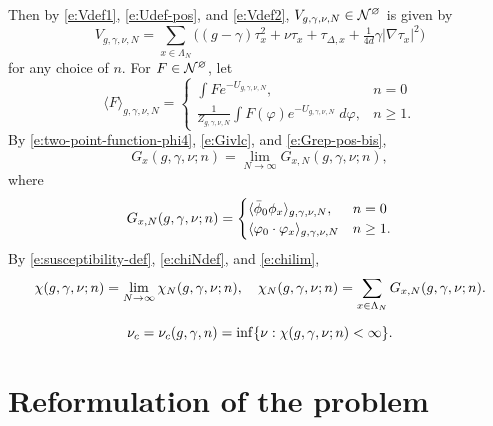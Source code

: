 Then by \eqref{e:Vdef1}, \eqref{e:Udef-pos}, and \eqref{e:Vdef2},
$V_{g,\gamma,\nu,N} \in \mathcal{N}^\varnothing$ is given by
\begin{equation}
V_{g,\gamma,\nu,N}
	=
\sum_{x\in\Lambda_N}
\Big(
	(g - \gamma) \tau_x^2 + \nu \tau_x + \tau_{\Delta,x} + \tfrac{1}{4 d} \gamma |\nabla\tau_x|^2
\Big)
\end{equation}
for any choice of $n$.
For $F \in \mathcal{N}^\varnothing$, let
\begin{equation}
\langle F \rangle_{g,\gamma,\nu,N}
	=
\begin{cases}
\displaystyle \int F e^{-U_{g,\gamma,\nu,N}},           & n = 0 \\
\displaystyle \frac{1}{Z_{g,\gamma,\nu,N}}
	\int F(\varphi) e^{-U_{g,\gamma,\nu,N}} \; d\varphi,  & n \ge 1.
\end{cases}
\end{equation}
By \eqref{e:two-point-function-phi4}, \eqref{e:Givlc}, and \eqref{e:Grep-pos-bis},
\begin{equation}
G_x(g, \gamma, \nu; n) = \lim_{N\to\infty} G_{x,N}(g, \gamma, \nu; n),
\end{equation}
where
\begin{equation}
G_{x,N}(g, \gamma, \nu; n)
	=
\begin{cases}
\langle \bar\phi_0 \phi_x \rangle_{g,\gamma,\nu,N},      & n = 0 \\
\langle \varphi_0 \cdot \varphi_x \rangle_{g,\gamma,\nu,N}  & n \ge 1.
\end{cases}
\end{equation}
By \eqref{e:susceptibility-def}, \eqref{e:chiNdef}, and \eqref{e:chilim},
\begin{equation}
\chi(g, \gamma, \nu; n)
	=
\lim_{N\rightarrow\infty} \chi_N(g, \gamma, \nu; n),
	\quad
\chi_N(g, \gamma, \nu; n)
	=
\sum_{x\in\Lambda_N} G_{x,N}(g, \gamma, \nu; n).
\end{equation}

\begin{equation}
\label{e:nuc-def}
\nu_c = \nu_c(g, \gamma, n) = \inf \{ \nu : \chi(g, \gamma, \nu; n) < \infty \}.
\end{equation}


\section{Reformulation of the problem}

